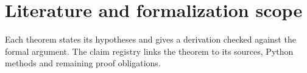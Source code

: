 \section{Literature and formalization scope}
Each theorem states its hypotheses and gives a derivation checked against the
formal argument. The claim registry links the theorem to its sources, Python
methods and remaining proof obligations.

\newcommand{\newleanmodule}[2]{#2}

